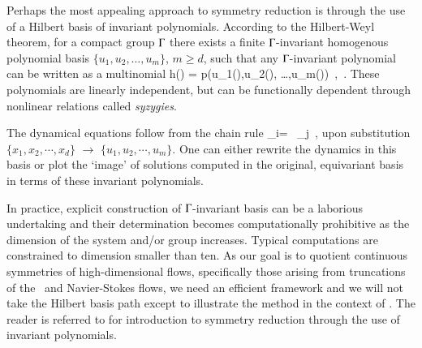 Perhaps the most appealing approach to symmetry reduction is
through the use of a Hilbert basis of invariant polynomials.
According to the Hilbert-Weyl theorem,
for a compact group $\Gamma$ there exists a finite
$\Gamma${-invariant} homogenous polynomial basis
$\{u_1,u_2, \dots,u_m\}$, $ m \geq d$,
such that any $\Gamma${-invariant} polynomial
can be written as a multinomial
\beq
h(\ssp) = p(u_1(\ssp),u_2(\ssp), \dots,u_m(\ssp))
    \,,\qquad \ssp \in \pS
\,.
These polynomials are linearly
independent, but can be functionally dependent through
nonlinear relations called \emph{syzygies}.

The dynamical
equations follow from the chain rule
\beq
 _i= \, _j
 \,,
upon substitution
$\{x_1,x_2,\cdots,x_d\}$ $\to$ $\{u_1,u_2,\cdots,u_m\}$.
One can either rewrite the dynamics in this basis or
plot the `image' of solutions computed in the original, equivariant
basis in terms of these invariant polynomials.


In practice, explicit construction of $\Gamma${-invariant} basis
can be a laborious undertaking and their determination becomes
computationally prohibitive as the dimension of the system and/or group
increases. Typical
computations are constrained to dimension smaller than ten.
As our goal is to quotient continuous symmetries of
high-dimensional flows, specifically those arising from
truncations of the \KS\ and Navier-Stokes flows,
we need an efficient framework and we will not take the Hilbert basis
path except to illustrate the method in the context of \cLe.
The reader is referred to 
for introduction to symmetry reduction through
the use of invariant polynomials.
